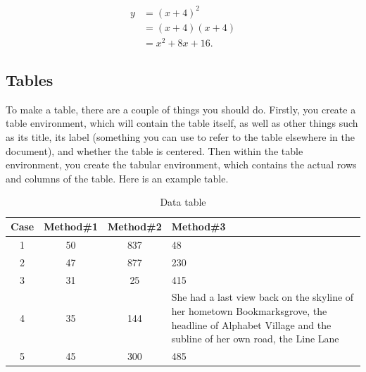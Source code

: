 \documentclass[11pt]{article}
\begin{document}
\begin{align*}
    y &= (x+4)^2 \\
    &= (x+4)(x+4) \\
    &= x^2 + 8x + 16.
\end{align*}

\subsection{Tables}

To make a table, there are a couple of things you should do. Firstly, you create a table environment, which will contain the table itself, as well as other things such as its title, its label (something you can use to refer to the table elsewhere in the document), and whether the table is centered. Then within the table environment, you create the tabular environment, which contains the actual rows and columns of the table. Here is an example table.

\begin{table}[h]
    \caption{Data table} %
    \label{table:table1}%
    \centering %
    \begin{tabular}{|c|c|c|p{5cm}|} %
        \hline                       %
        Case & Method\#1 & Method\#2 & Method\#3 \\  %
        \hline                  %
        1 & 50 & 837 & 48 \\ %
        \hline                  %
        2 & 47 & 877 & 230  \\
        \hline
        3 & 31 & 25  & 415  \\
        \hline
        4 & 35 & 144 & She had a last view back on the skyline of her hometown Bookmarksgrove, the headline of Alphabet Village and the subline of her own road, the Line Lane \\
        \hline
        5 & 45 & 300 & 485 \\
        \hline 
    \end{tabular}
\end{table}
\end{document}
